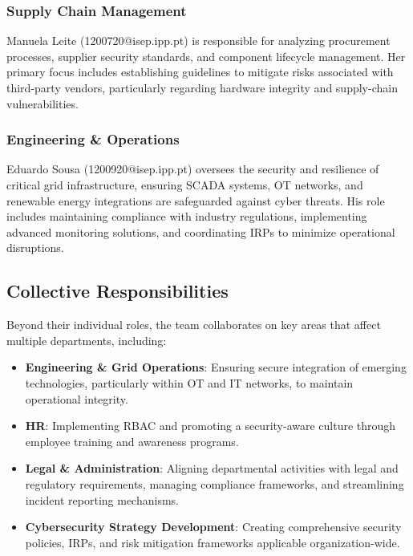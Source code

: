 \subsubsection*{Supply Chain Management}
Manuela Leite (1200720@isep.ipp.pt) is responsible for analyzing procurement processes, supplier security standards, and component lifecycle management. Her primary focus includes establishing guidelines to mitigate risks associated with third-party vendors, particularly regarding hardware integrity and supply-chain vulnerabilities.


\subsubsection*{Engineering \& Operations}
Eduardo Sousa (1200920@isep.ipp.pt) oversees the security and resilience of critical grid infrastructure, ensuring \ac{SCADA} systems, \ac{OT} networks, and renewable energy integrations are safeguarded against cyber threats. His role includes maintaining compliance with industry regulations, implementing advanced monitoring solutions, and coordinating \ac{IRP}s to minimize operational disruptions.


\subsection{Collective Responsibilities}

Beyond their individual roles, the team collaborates on key areas that affect multiple departments, including:

\begin{itemize}
    \item \textbf{Engineering \& Grid Operations}: Ensuring secure integration of emerging technologies, particularly within \ac{OT} and \ac{IT} networks, to maintain operational integrity.
    \item \textbf{\ac{HR}}: Implementing \ac{RBAC} and promoting a security-aware culture through employee training and awareness programs.
    \item \textbf{Legal \& Administration}: Aligning departmental activities with legal and regulatory requirements, managing compliance frameworks, and streamlining incident reporting mechanisms.
    \item \textbf{Cybersecurity Strategy Development}: Creating comprehensive security policies, \ac{IRP}s, and risk mitigation frameworks applicable organization-wide.
\end{itemize}

